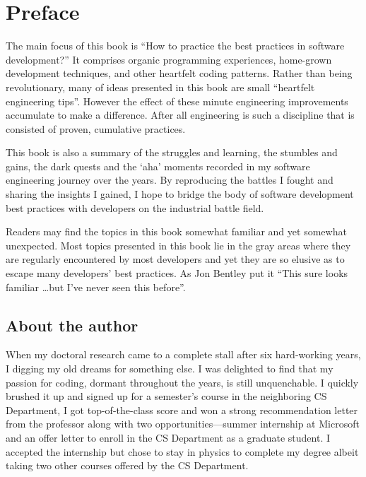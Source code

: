 \chapter{Preface} \label{ch:preface}


The main focus of this book is ``How to practice the best practices in software development?''
It comprises organic programming experiences, home-grown development techniques,
and other heartfelt coding patterns. %
Rather than being revolutionary, many of ideas presented in this book are small
``heartfelt engineering tips''.
However the effect of these minute engineering improvements accumulate to make a difference.
After all engineering is such a discipline that is consisted of proven, cumulative practices.


This book is also a summary of the struggles and learning, the stumbles and gains, the dark
quests and the `aha' moments recorded in my software engineering journey over the years.
By reproducing the battles I fought and sharing the insights I gained, I hope to
bridge the body of software development best practices with developers
on the industrial battle field.


Readers may find the topics in this book somewhat familiar and yet somewhat unexpected.
Most topics presented in this book lie in the gray areas where they are regularly encountered
by most developers and yet they are so elusive as to escape many developers' best practices.
As Jon Bentley put it ``This sure looks familiar \ldots but I've never seen this
before''\cite{Bentley:1986:PP}.


\section{About the author}\label{sec:whoAmI}

When my doctoral research came to a complete stall after six hard-working years, I
digging my old dreams for something else.
I was delighted to find that my passion for coding,
dormant throughout the years, is still unquenchable.
I quickly brushed it up and signed up for a semester's course in the neighboring CS Department, I
got top-of-the-class score and won a strong recommendation letter from the professor along with
two opportunities---summer internship at Microsoft and an offer letter to enroll in
the CS Department as a graduate student.
I accepted the internship but chose to stay in physics to complete my degree albeit taking two
other courses offered by the CS Department.


